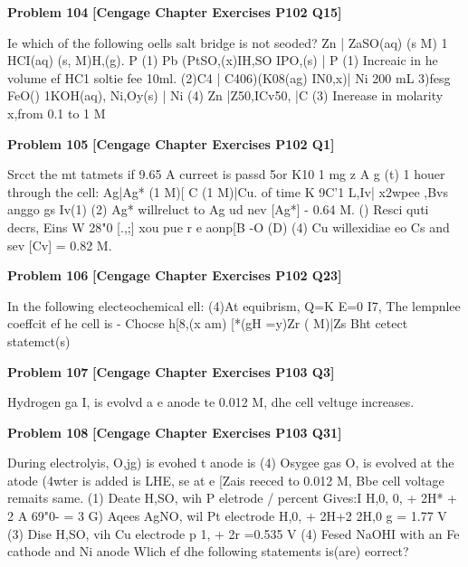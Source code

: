 \begin{problembox}
\textbf{Problem 104} \hfill \textbf{[Cengage Chapter Exercises P102 Q15]}
\label{q:ext-cng-th-104}

Ie which of the following oells salt bridge is not seoded?
Zn | ZaSO(aq) (s M) 1 HCI(aq) (s, M)H,(g). P
(1) Pb (PtSO,(x)IH,SO IPO,(s) | P
(1) Increaic in he volume ef HC1 soltie fee 10ml.
(2)C4 | C406)(K08(ag) IN0,x)| Ni
200 mL
3)fesg FeO() 1KOH(aq), Ni,Oy(s) | Ni
(4) Zn |Z50,ICv50, |C
(3) Inerease in molarity x,from 0.1 to 1 M
\end{problembox}

\begin{problembox}
\textbf{Problem 105} \hfill \textbf{[Cengage Chapter Exercises P102 Q1]}
\label{q:ext-cng-th-105}

Srcct the mt tatmets if 9.65 A curreet is passd 5or
K10 1 mg z A  g (t)
1 houer through the cell:
Ag|Ag* (1 M)[ C (1 M)|Cu.
of time
K 9C'1  L,Iv| x2wpee ,Bvs anggo gs Iv(1)
(2) Ag* willreluct to Ag ud nev [Ag*] - 0.64 M.
() Resci quti  decrs, Eins
W 28"0  [.,;] xou pue r e aonp[B -O (D)
(4) Cu willexidiae eo Cs and sev [Cv] = 0.82 M.
\end{problembox}

\begin{problembox}
\textbf{Problem 106} \hfill \textbf{[Cengage Chapter Exercises P102 Q23]}
\label{q:ext-cng-th-106}

In the following electeochemical ell:
(4)At equibrism, Q=K E=0
I7, The lempnlee coeffcit ef he cell is 
- Chocse
h[8,(x am) [*(gH =y)Zr ( M)|Zs
Bht cetect statemct(s)
\end{problembox}

\begin{problembox}
\textbf{Problem 107} \hfill \textbf{[Cengage Chapter Exercises P103 Q3]}
\label{q:ext-cng-th-107}

Hydrogen ga I, is evolvd a e anode
te 0.012 M, dhe cell veltuge increases.
\end{problembox}

\begin{problembox}
\textbf{Problem 108} \hfill \textbf{[Cengage Chapter Exercises P103 Q31]}
\label{q:ext-cng-th-108}

During electrolyis, O,jg) is evohed t anode is
(4) Osygee gas O, is evolved at the atode
(4wter is added is LHE, se at e [Zais reeced
to 0.012 M, Bbe cell voltage remaits same.
(1) Deate H,SO, wih P eletrode
/ percent  Gives:I
H,0,  0, + 2H* + 2
A 69"0- = 3
G) Aqees AgNO, wil Pt electrode
H,0, + 2H+2  2H,0
g  = 1.77 V
(3) Dise H,SO, vih Cu electrode
p 1, + 2r
  =0.535 V
(4) Fesed NaOHI with an Fe cathode and Ni anode
Wlich ef dhe following statements is(are) eorrect?
\end{problembox}


